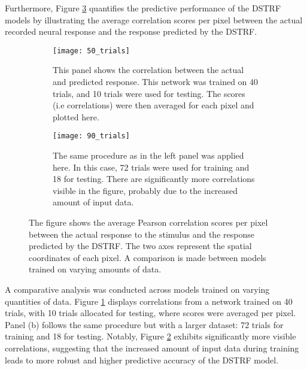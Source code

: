 Furthermore, Figure \ref{fig:50trials} quantifies the predictive performance of the DSTRF models by illustrating the average correlation scores per pixel between the actual recorded neural response and the response predicted by the DSTRF.

\begin{figure}[!htb]
	\begin{subfigure}{0.45\textwidth}
		\texttt{[image: 50\_trials]}
		\caption{This panel shows the correlation between the actual and predicted response. This network was trained on 40 trials, and 10 trials were used for testing. The scores (i.e correlations) were then averaged for each pixel and plotted here.}
		\label{subfig:50trials}
	\end{subfigure}
	\hfill
	\begin{subfigure}{0.45\textwidth}
		\texttt{[image: 90\_trials]}
		\caption{The same procedure as in the left panel was applied here. In this case, 72 trials were used for training and 18 for testing. There are significantly more correlations visible in the figure, probably due to the increased amount of input data.}
		\label{subfig:90trials}
	\end{subfigure}
	\caption{The figure shows the average Pearson correlation scores per pixel between the actual response to the stimulus and the response predicted by the DSTRF. The two axes represent the spatial coordinates of each pixel. A comparison is made between models trained on varying amounts of data.}
	\label{fig:50trials}
\end{figure}

A comparative analysis was conducted across models trained on varying quantities of data. Figure \ref{subfig:50trials} displays correlations from a network trained on 40 trials, with 10 trials allocated for testing, where scores were averaged per pixel. Panel (b) follows the same procedure but with a larger dataset: 72 trials for training and 18 for testing. Notably, Figure \ref{subfig:90trials} exhibits significantly more visible correlations, suggesting that the increased amount of input data during training leads to more robust and higher predictive accuracy of the DSTRF model.

